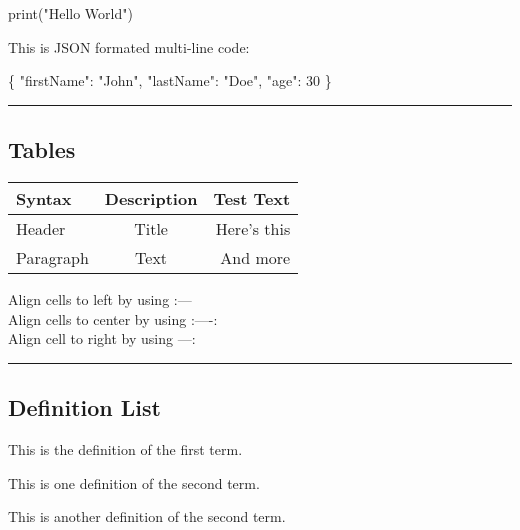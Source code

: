 \documentclass[]{article}
\newenvironment{Shaded}{}{}
\newcommand{\DataTypeTok}[1]{\textcolor[rgb]{0.56,0.13,0.00}{#1}}
\newcommand{\DecValTok}[1]{\textcolor[rgb]{0.25,0.63,0.44}{#1}}
\newcommand{\StringTok}[1]{\textcolor[rgb]{0.25,0.44,0.63}{#1}}
\newcommand{\FunctionTok}[1]{\textcolor[rgb]{0.02,0.16,0.49}{#1}}
\newcommand{\BuiltInTok}[1]{#1}
\newcommand{\NormalTok}[1]{#1}
\providecommand{\tightlist}{%
  \setlength{\itemsep}{0pt}\setlength{\parskip}{0pt}}
\begin{document}
\begin{Shaded}
\begin{Highlighting}[]
\BuiltInTok{print}\NormalTok{(}\StringTok{"Hello World"}\NormalTok{)}
\end{Highlighting}
\end{Shaded}

This is JSON formated multi-line code:

\begin{Shaded}
\begin{Highlighting}[]
\FunctionTok{\{}
  \DataTypeTok{"firstName"}\FunctionTok{:} \StringTok{"John"}\FunctionTok{,}
  \DataTypeTok{"lastName"}\FunctionTok{:} \StringTok{"Doe"}\FunctionTok{,}
  \DataTypeTok{"age"}\FunctionTok{:} \DecValTok{30}
\FunctionTok{\}}
\end{Highlighting}
\end{Shaded}

\begin{center}\rule{0.5\linewidth}{\linethickness}\end{center}

\subsection{Tables}\label{tables}

\begin{longtable}[]{@{}lcr@{}}
\toprule
Syntax & Description & Test Text\tabularnewline
\midrule
\endhead
Header & Title & Here's this\tabularnewline
Paragraph & Text & And more\tabularnewline
\bottomrule
\end{longtable}

 Align cells to left by using :---\\
Align cells to center by using :----:\\
Align cell to right by using ---:

\begin{center}\rule{0.5\linewidth}{\linethickness}\end{center}

\subsection{Definition List}\label{definition-list}

\begin{description}
\tightlist
\item[First Term]
This is the definition of the first term.
\item[Second Term]
This is one definition of the second term.

This is another definition of the second term.
\end{description}
\end{document}
